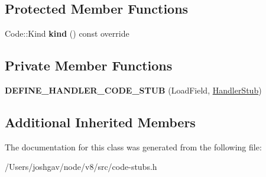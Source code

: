 \subsection*{Protected Member Functions}
\begin{DoxyCompactItemize}
\item 
Code\+::\+Kind {\bfseries kind} () const  override\hypertarget{classv8_1_1internal_1_1_load_field_stub_a31214fab92b2f03cd854f4d90663b1e7}{}\label{classv8_1_1internal_1_1_load_field_stub_a31214fab92b2f03cd854f4d90663b1e7}

\end{DoxyCompactItemize}
\subsection*{Private Member Functions}
\begin{DoxyCompactItemize}
\item 
{\bfseries D\+E\+F\+I\+N\+E\+\_\+\+H\+A\+N\+D\+L\+E\+R\+\_\+\+C\+O\+D\+E\+\_\+\+S\+T\+UB} (Load\+Field, \hyperlink{classv8_1_1internal_1_1_handler_stub}{Handler\+Stub})\hypertarget{classv8_1_1internal_1_1_load_field_stub_a3941c4acc6bdc057eec6e5dfc0de25a7}{}\label{classv8_1_1internal_1_1_load_field_stub_a3941c4acc6bdc057eec6e5dfc0de25a7}

\end{DoxyCompactItemize}
\subsection*{Additional Inherited Members}


The documentation for this class was generated from the following file\+:\begin{DoxyCompactItemize}
\item 
/\+Users/joshgav/node/v8/src/code-\/stubs.\+h\end{DoxyCompactItemize}
